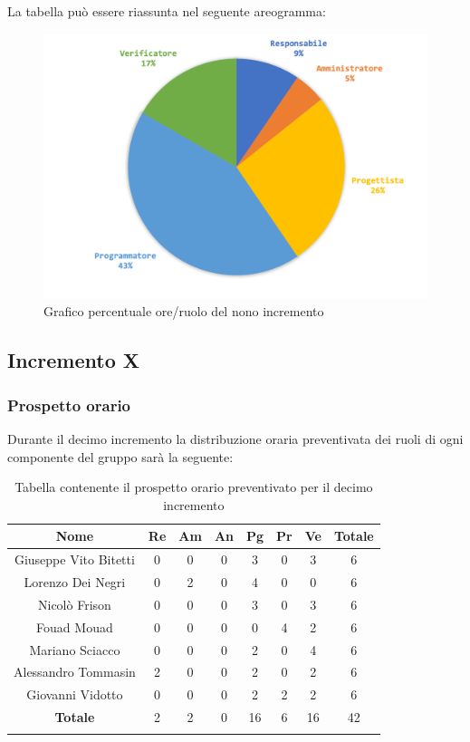 		La tabella può essere riassunta nel seguente areogramma:
		\begin{figure}[H]
			\centering
			\includegraphics[width=0.8\linewidth]{./images/preventivo/incremento9-2.png}
			\caption{Grafico percentuale ore/ruolo del nono incremento}
			\label{fig:grafico costi ruolo incremento IX}
		\end{figure}
		
		
		
	\subsection{Incremento X}
		\subsubsection{Prospetto orario}
		Durante il decimo incremento la distribuzione oraria preventivata dei ruoli di ogni componente del gruppo sarà la seguente:
		
		\begin{longtable}{|c|c|c|c|c|c|c|c|}
			\hline
			\rowcolor{lighter-grayer}
			\textbf{Nome} & \textbf{Re} & \textbf{Am} & \textbf{An} & \textbf{Pg}  & \textbf{Pr}   & \textbf{Ve} & \textbf{Totale} \\
			\hline
			\endfirsthead
			
			\hline
			Giuseppe Vito Bitetti 		 & 0 & 0 & 0 & 3 & 0 & 3 & 6\\
			\hline
			\hline
			Lorenzo Dei Negri			 & 0 & 2 & 0 & 4 & 0 & 0 & 6\\
			\hline
			\hline
			Nicolò Frison				      & 0 & 0 & 0 & 3 & 0 & 3 & 6\\
			\hline
			\hline
			Fouad Mouad 				   & 0 & 0 & 0 & 0 & 4 & 2 & 6\\
			\hline
			\hline
			Mariano Sciacco 			 & 0 & 0 & 0 & 2 & 0 & 4 & 6\\
			\hline
			\hline
			Alessandro Tommasin    & 2 & 0 & 0 & 2 & 0 & 2 & 6\\
			\hline
			\hline
			Giovanni Vidotto 			  & 0 & 0 & 0 & 2 & 2 & 2 & 6\\
			\hline 
			\textbf{Totale}			 		& 2 & 2 & 0 & 16 & 6 & 16 & 42\\
			\hline
			\caption{Tabella contenente il prospetto orario preventivato per il decimo incremento}
		\end{longtable}
		\pagebreak
		
